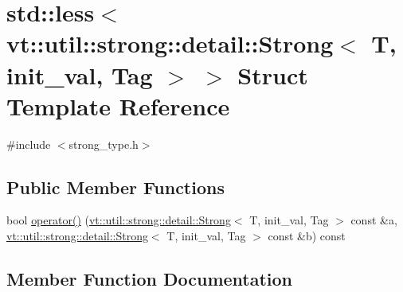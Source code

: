 \hypertarget{structstd_1_1less_3_01vt_1_1util_1_1strong_1_1detail_1_1_strong_3_01_t_00_01init__val_00_01_tag_01_4_01_4}{}\section{std\+:\+:less$<$ vt\+:\+:util\+:\+:strong\+:\+:detail\+:\+:Strong$<$ T, init\+\_\+val, Tag $>$ $>$ Struct Template Reference}
\label{structstd_1_1less_3_01vt_1_1util_1_1strong_1_1detail_1_1_strong_3_01_t_00_01init__val_00_01_tag_01_4_01_4}


{\ttfamily \#include $<$strong\+\_\+type.\+h$>$}

\subsection*{Public Member Functions}
\begin{DoxyCompactItemize}
\item 
bool \hyperlink{structstd_1_1less_3_01vt_1_1util_1_1strong_1_1detail_1_1_strong_3_01_t_00_01init__val_00_01_tag_01_4_01_4_ad720939ebf633ba8e2411a5e2406f3aa}{operator()} (\hyperlink{structvt_1_1util_1_1strong_1_1detail_1_1_strong}{vt\+::util\+::strong\+::detail\+::\+Strong}$<$ T, init\+\_\+val, Tag $>$ const \&a, \hyperlink{structvt_1_1util_1_1strong_1_1detail_1_1_strong}{vt\+::util\+::strong\+::detail\+::\+Strong}$<$ T, init\+\_\+val, Tag $>$ const \&b) const
\end{DoxyCompactItemize}


\subsection{Member Function Documentation}
\mbox{\label{structstd_1_1less_3_01vt_1_1util_1_1strong_1_1detail_1_1_strong_3_01_t_00_01init__val_00_01_tag_01_4_01_4_ad720939ebf633ba8e2411a5e2406f3aa}} 
